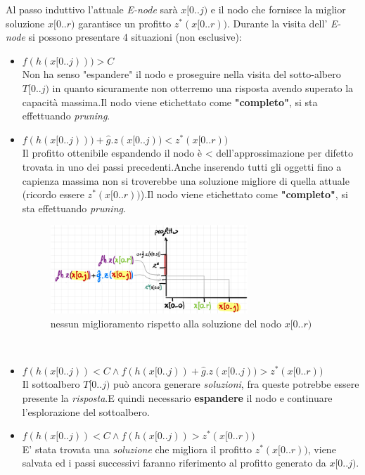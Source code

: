 \documentclass[a4paper]{article}
\begin{document}
\begin{adjustwidth}{.8cm}{0cm}
	Al passo induttivo l'attuale \textit{E-node} sarà $x[0..j)$ e il nodo che fornisce la miglior soluzione $x[0..r)$ garantisce un profitto $z^*(x[0..r))$.
	Durante la visita dell' \textit{E-node} si possono presentare 4 situazioni (non esclusive):
	\begin{itemize}
		\item $f(h(x[0..j))) > C$\\
			Non ha senso "espandere" il nodo e proseguire nella visita del sotto-albero $T[0..j)$ in quanto sicuramente non otterremo una risposta avendo superato la capacità massima.Il nodo viene etichettato come \textbf{"completo"}, si sta effettuando \textit{pruning}.
		\item$f(h(x[0..j))) + \hat{g}.z(x[0..j)) < z^*(x[0..r))$\\
			Il profitto ottenibile espandendo il nodo è < dell'approssimazione per difetto trovata in uno dei passi precedenti.Anche inserendo tutti gli oggetti fino a capienza massima non si troverebbe una soluzione migliore di quella attuale (ricordo essere $z^*(x[0..r))$).Il nodo viene etichettato come \textbf{"completo"}, si sta effettuando \textit{pruning}.
\begin{figure}[!ht]
\centering
\includegraphics[width=0.7\textwidth]{./img/C14_item2.png}
\caption{nessun miglioramento rispetto alla soluzione del nodo $x[0..r)$} \label{FIG:C14_item2}
\end{figure}\\
		\item $f(h(x[0..j)) < C \land f(h(x[0..j)) + \hat{g}.z(x[0..j)) > z^*(x[0..r))$\\
			Il sottoalbero $T[0..j)$ può ancora generare \textit{soluzioni}, fra queste potrebbe essere presente la \textit{risposta}.E quindi necessario \textbf{espandere} il nodo e continuare l'esplorazione del sottoalbero.
		\item $f(h(x[0..j)) < C \land f(h(x[0..j)) > z^*(x[0..r))$\\
			E' stata trovata una \textit{soluzione} che migliora il profitto $z^*(x[0..r))$, viene salvata ed i passi successivi faranno riferimento al profitto generato da $x[0..j)$.

\end{itemize}
\end{adjustwidth}
\end{document}
